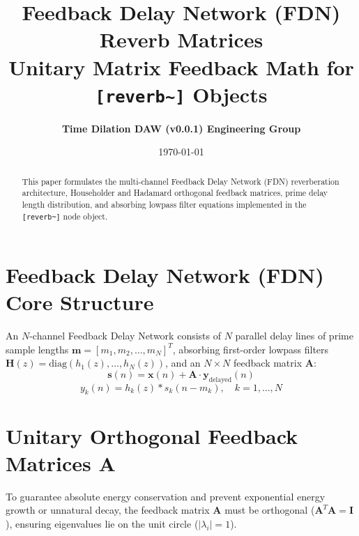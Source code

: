 \documentclass[11pt,a4paper]{article}
\title{\textbf{\Huge Feedback Delay Network (FDN) Reverb Matrices}\\[0.5em]
\Large Unitary Matrix Feedback Math for \texttt{[reverb\textasciitilde{}]} Objects}
\author{\textbf{Time Dilation DAW (v0.0.1) Engineering Group}}
\date{\today}
\begin{document}
\maketitle

\begin{abstract}
This paper formulates the multi-channel Feedback Delay Network (FDN) reverberation architecture, Householder and Hadamard orthogonal feedback matrices, prime delay length distribution, and absorbing lowpass filter equations implemented in the \texttt{[reverb\textasciitilde{}]} node object.
\end{abstract}

\section{Feedback Delay Network (FDN) Core Structure}
An $N$-channel Feedback Delay Network consists of $N$ parallel delay lines of prime sample lengths $\mathbf{m} = [m_1, m_2, \dots, m_N]^T$, absorbing first-order lowpass filters $\mathbf{H}(z) = \text{diag}(h_1(z), \dots, h_N(z))$, and an $N \times N$ feedback matrix $\mathbf{A}$:
\begin{equation}
\mathbf{s}(n) = \mathbf{x}(n) + \mathbf{A} \cdot \mathbf{y}_{\text{delayed}}(n)
\end{equation}
\begin{equation}
y_k(n) = h_k(z) * s_k(n - m_k), \quad k = 1, \dots, N
\end{equation}

\section{Unitary Orthogonal Feedback Matrices $\mathbf{A}$}
To guarantee absolute energy conservation and prevent exponential energy growth or unnatural decay, the feedback matrix $\mathbf{A}$ must be orthogonal ($\mathbf{A}^T \mathbf{A} = \mathbf{I}$), ensuring eigenvalues lie on the unit circle ($|\lambda_i| = 1$).
\end{document}
